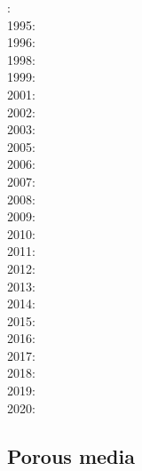 {\scriptsize
{}: \cite{rich94}\cite{fari94}\\
1995: \cite{whmc95}\\
1996: \cite{zhgm96}\\
1998: \cite{bisp98}\cite{most98}\\
1999: \cite{most99}\cite{shet99}\\
2001: \cite{vapy01}\\
2002: \cite{foul02}\\
2003: \cite{vazh03}\\
2005: \cite{bugu05}\cite{fasa05}\\
2006: \cite{dabu06}\\
2007: \cite{stco07}\\
2008: \cite{uegs08}\cite{slee08}\\
2009: \cite{bucl09}\cite{zhgy09}\cite{baiv10}\cite{tabs09}\cite{maml09}\\
2010: \cite{fabl10}\\
2011: \cite{sosk11}\cite{vasd11}\\
2012: \cite{huco12}\cite{gubc12}\cite{egim17}\\
2013: \cite{bemm12}\cite{brps13}\\
2014: \cite{buge14}\cite{gery14b}\cite{buto14}\cite{buit14}\cite{leli14}\\
2015: \cite{bemm15}\cite{gesb15}\cite{kocb15}\cite{meds15}\cite{lile15}\cite{medd15}\cite{frro15}\\
2016: \cite{fige16}\cite{gadb16}\cite{kobc16}\\
2017: \cite{bahf17}\cite{brsg17}\cite{bahf17}\cite{bekb17}\cite{kocb17}\\
2018: \cite{daga18}\cite{frkc18}\cite{frbr18}\\
2019: \cite{kobg19}\cite{stbl19}\cite{botb19}\\
2020:\cite{basg20}
}

\subsection{Porous media} 

{\scriptsize
\noindent
\cite{scst86}
\cite{scot88}
\cite{spie93}
\cite{scth00b}
\cite{dyge13}
\cite{eitp19}
\cite{eitf20}
}


